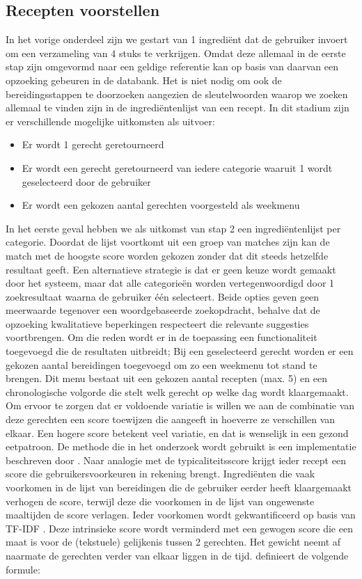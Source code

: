 \documentclass{hogent-article}
\begin{document}
\subsection{Recepten voorstellen}%

In het vorige onderdeel zijn we gestart van 1 ingrediënt dat de gebruiker invoert om een verzameling van 4 stuks te verkrijgen. Omdat deze allemaal in de eerste stap zijn omgevormd naar een geldige referentie kan op basis van daarvan een opzoeking gebeuren in de databank. Het is niet nodig om ook de bereidingsstappen te doorzoeken aangezien de sleutelwoorden waarop we zoeken allemaal te vinden zijn in de ingrediëntenlijst van een recept. In dit stadium zijn er verschillende mogelijke uitkomsten als uitvoer:

\begin{itemize}
    \item Er wordt 1 gerecht geretourneerd
    \item Er wordt een gerecht geretourneerd van iedere categorie waaruit 1 wordt geselecteerd door de gebruiker
    \item Er wordt een gekozen aantal gerechten voorgesteld als weekmenu
\end{itemize}

In het eerste geval hebben we als uitkomst van stap 2 een ingrediëntenlijst per categorie. Doordat de lijst voortkomt uit een groep van matches zijn kan de match met de hoogste score worden gekozen zonder dat dit steeds hetzelfde resultaat geeft. Een alternatieve strategie is dat er geen keuze wordt gemaakt door het systeem, maar dat alle categorieën worden vertegenwoordigd door 1 zoekresultaat waarna de gebruiker één selecteert.
Beide opties geven geen meerwaarde tegenover een woordgebaseerde zoekopdracht, behalve dat de opzoeking kwalitatieve beperkingen respecteert die relevante suggesties voortbrengen. Om die reden wordt er in de toepassing een functionaliteit toegevoegd die de resultaten uitbreidt; Bij een geselecteerd gerecht worden er een gekozen aantal bereidingen toegevoegd om zo een weekmenu tot stand te brengen. Dit menu bestaat uit een gekozen aantal recepten (max. 5) en een chronologische volgorde die stelt welk gerecht op welke dag wordt klaargemaakt. Om ervoor te zorgen dat er voldoende variatie is willen we aan de combinatie van deze gerechten een score toewijzen die aangeeft in hoeverre ze verschillen van elkaar. Een hogere score betekent veel variatie, en dat is wenselijk in een gezond eetpatroon. 
De methode die in het onderzoek wordt gebruikt is een implementatie beschreven door \textcite{Ueda2011}. Naar analogie met de typicaliteitsscore krijgt ieder recept een score die gebruikersvoorkeuren in rekening brengt. Ingrediënten die vaak voorkomen in de lijst van bereidingen die de gebruiker eerder heeft klaargemaakt verhogen de score, terwijl deze die voorkomen in de lijst van ongewenste maaltijden de score verlagen. Ieder voorkomen wordt gekwantificeerd op basis van TF-IDF \autocite{Karabiber2024}. Deze intrinsieke score wordt verminderd met een gewogen score die een maat is voor de (tekstuele) gelijkenis tussen 2 gerechten. Het gewicht neemt af naarmate de gerechten verder van elkaar liggen in de tijd. \textcite{Ueda2011} definieert de volgende formule:
\end{document}
